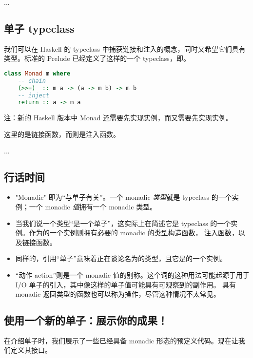 \documentclass[./main.tex]{subfiles}
\begin{document}
...

\subsection*{单子 typeclass}

我们可以在 Haskell 的 typeclass 中捕获链接和注入的概念，同时又希望它们具有类型。标准的 Prelude 已经定义了这样的一个 typeclass，即。

\begin{lstlisting}[language=Haskell]
  class Monad m where
    -- chain
    (>>=)  :: m a -> (a -> m b) -> m b
    -- inject
    return :: a -> m a
\end{lstlisting}

注：新的 Haskell 版本中 Monad 还需要先实现实例，而又需要先实现实例。

这里的\acode{>>=}是链接函数，而则是注入函数。

...

\subsection*{行话时间}

\begin{itemize}
  \item "Monadic" 即为“与单子有关”。一个 monadic \textit{类型}就是 typeclass 的一个实例；一个 monadic \textit{值}拥有一个 monadic 类型。
  \item 当我们说一个类型“是一个单子”，这实际上在简述它是 typeclass 的一个实例。作为的一个实例则拥有必要的 monadic 的类型构造函数，
        注入函数，以及链接函数。
  \item 同样的，引用“单子”意味着正在谈论名为的类型，且它是的一个实例。
  \item “动作 action”则是一个 monadic 值的别称。这个词的这种用法可能起源于用于 I/O 单子的引入，其中像这样的单子值可能具有可观察到的副作用。
        具有 monadic 返回类型的函数也可以称为操作，尽管这种情况不太常见。
\end{itemize}

\subsection*{使用一个新的单子：展示你的成果！}

在介绍单子时，我们展示了一些已经具备 monadic 形态的预定义代码。现在让我们定义其接口。
\end{document}
